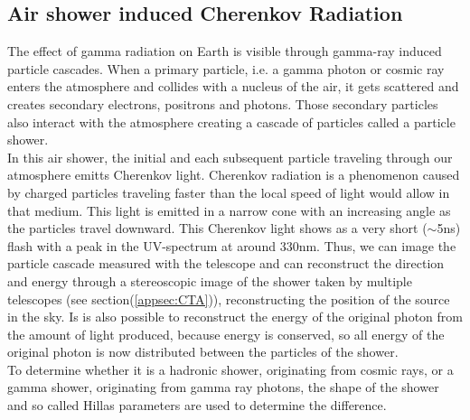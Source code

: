 \documentclass[12pt,article,type=msc,colorback,accentcolor=tud9c]{tudthesis}
\begin{document}
\subsection{Air shower induced Cherenkov Radiation}

\begin{wrapfigure}{R}{0.4\textwidth}
\centering
\texttt{[image: D:/OwnCloudData/00\_WriteUP/04\_Thesis/Pic/Proposal/Fig/\{gamma]}.jpg}
\caption[Cherenkov light cone]{\label{fig:Cherenkov} The cone of Cherenkov light emitted by an extensive air shower. Picture from \cite{AsperaCTA}}
\end{wrapfigure}

The effect of gamma radiation on Earth is visible through gamma-ray induced particle cascades. When a primary particle, i.e. a gamma photon or cosmic ray enters the atmosphere and collides with a nucleus of the air, it gets scattered and creates secondary electrons, positrons and photons. Those secondary particles also interact with the atmosphere creating a cascade of particles called a particle shower.\\
In this air shower, the initial and each subsequent particle traveling through our atmosphere emitts Cherenkov light. Cherenkov radiation is a phenomenon caused by charged particles traveling faster than the local speed of light would allow in that medium. This light is emitted in a narrow cone with an increasing angle as the particles travel downward. This Cherenkov light shows as a very short ($\sim$5ns) flash with a peak in the UV-spectrum at around 330nm.
Thus, we can image the particle cascade measured with the telescope and can reconstruct the direction and energy through a stereoscopic image of the shower taken by multiple telescopes (see section(\ref{appsec:CTA})), reconstructing the position of the source in the sky. Is is also possible to reconstruct the energy of the original photon from the amount of light produced, because energy is conserved, so all energy of the original photon is now distributed between the particles of the shower.\\
To determine whether it is a hadronic shower, originating from cosmic rays, or a gamma shower, originating from gamma ray photons, the shape of the shower and so called Hillas parameters are used to determine the difference.
\end{document}

